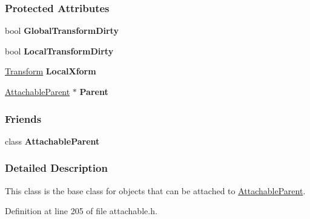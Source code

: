 \subsubsection*{Protected Attributes}
\begin{DoxyCompactItemize}
\item 
\hypertarget{classMezzanine_1_1AttachableChild_a6940c66cc4725deb27024ddd6c5459b8}{
bool {\bfseries GlobalTransformDirty}}
\label{classMezzanine_1_1AttachableChild_a6940c66cc4725deb27024ddd6c5459b8}

\item 
\hypertarget{classMezzanine_1_1AttachableChild_a142c9f848101dec654f8eeca88e689b5}{
bool {\bfseries LocalTransformDirty}}
\label{classMezzanine_1_1AttachableChild_a142c9f848101dec654f8eeca88e689b5}

\item 
\hypertarget{classMezzanine_1_1AttachableChild_adc604405ff0ac70699a0286b5e4869b9}{
\hyperlink{classMezzanine_1_1Transform}{Transform} {\bfseries LocalXform}}
\label{classMezzanine_1_1AttachableChild_adc604405ff0ac70699a0286b5e4869b9}

\item 
\hypertarget{classMezzanine_1_1AttachableChild_acdd3042178a3bdc83c483b55498ae76e}{
\hyperlink{classMezzanine_1_1AttachableParent}{AttachableParent} $\ast$ {\bfseries Parent}}
\label{classMezzanine_1_1AttachableChild_acdd3042178a3bdc83c483b55498ae76e}

\end{DoxyCompactItemize}
\subsubsection*{Friends}
\begin{DoxyCompactItemize}
\item 
\hypertarget{classMezzanine_1_1AttachableChild_a7d495633cc192a4d3cc2f040a97e05f2}{
class {\bfseries AttachableParent}}
\label{classMezzanine_1_1AttachableChild_a7d495633cc192a4d3cc2f040a97e05f2}

\end{DoxyCompactItemize}


\subsubsection{Detailed Description}
This class is the base class for objects that can be attached to \hyperlink{classMezzanine_1_1AttachableParent}{AttachableParent}. 

Definition at line 205 of file attachable.h.



